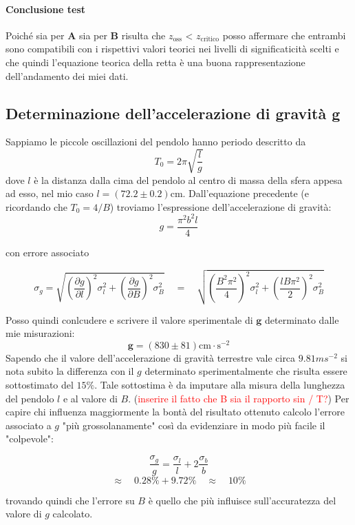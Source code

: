 \documentclass{article}
\begin{document}
\paragraph{Conclusione test} Poiché sia per $\mathbf{A}$ sia per $\mathbf{B}$ risulta che $z_{\text{oss}}$ < $z_{\text{critico}}$ posso affermare che entrambi sono compatibili con i rispettivi valori teorici nei livelli di significaticità scelti e che quindi l'equazione teorica della retta è una buona rappresentazione dell'andamento dei miei dati.

\subsection{Determinazione dell'accelerazione di gravità g}
Sappiamo le piccole oscillazioni del pendolo hanno periodo descritto da
\[
T_0 = 2\pi \sqrt{\frac{l}{g}} 
\]
dove $l$ è la distanza dalla cima del pendolo al centro di massa della sfera appesa ad esso, nel mio caso $l = (72.2 \pm 0.2)$cm. Dall'equazione precedente (e ricordando che $T_0 = 4/B$) troviamo l'espressione dell'accelerazione di gravità:
\[
g = \frac{\pi^2b^2l}{4}
\]

con errore associato

\[
\sigma_g = \sqrt{\left(\frac{\partial g}{\partial l} \right)^2\sigma_l^2 + \left(\frac{\partial g}{\partial B} \right)^2 \sigma_B^2}  \quad = \quad 	\sqrt{\left(\frac{B^2\pi^2}{4}\right)^2 \sigma_l^2 + \left( \frac{lB\pi^2}{2}  \right)^2 \sigma_B^2}	 
\]


\noindent
Posso quindi conlcudere e scrivere il valore sperimentale di $\mathbf{g}$ determinato dalle mie misurazioni:
\[
\mathbf{g} = (830 \pm 81)\text{cm}\cdot \text{s}^{-2}
\]
\noindent
Sapendo che il valore dell'accelerazione di gravità terrestre vale circa $9.81ms^{-2}$ si nota subito la differenza con il $g$ determinato sperimentalmente che risulta essere sottostimato del $15\%$. Tale sottostima è da imputare alla misura della lunghezza del pendolo $l$ e al valore di $B$. (\textcolor{red}{inserire il fatto che B sia il rapporto sin / T?}) Per capire chi influenza maggiormente la bontà del risultato ottenuto calcolo l'errore associato a $g$ "più grossolanamente" così da evidenziare in modo più facile il "colpevole":

\[
		\frac{\sigma_g}{g} = \frac{\sigma_l}{l} + 2\frac{\sigma_b}{b} 
\]
\[
		\approx \quad 0.28 \% + 9.72 \% \quad \approx  \quad 10\%	
\]

trovando quindi che l'errore su $B$ è quello che più influisce sull'accuratezza del valore di $g$ calcolato.
\\
\end{document}
